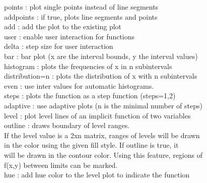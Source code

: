 \documentclass[a4paper,10pt]{article}
\begin{document}
\begin{eulernotebook}
\begin{eulercomment}
\begin{eulercomment}
\begin{eulercomment}
\begin{eulercomment}
\begin{eulercomment}
\begin{eulercomment}
\begin{eulercomment}
\begin{eulercomment}
\begin{eulercomment}
\begin{eulercomment}
\begin{eulercomment}
\begin{eulercomment}
\begin{eulercomment}
\begin{eulercomment}
\begin{eulercomment}
\begin{eulercomment}
\begin{eulercomment}
\begin{eulercomment}
\begin{eulercomment}
\begin{eulercomment}
\begin{eulercomment}
\begin{eulercomment}
\begin{eulercomment}
\begin{eulercomment}
\begin{eulercomment}
\begin{eulercomment}
\begin{eulercomment}
\begin{eulercomment}
\begin{eulercomment}
\begin{eulercomment}
\begin{eulercomment}
\begin{eulercomment}
\begin{eulercomment}
\begin{eulercomment}
\begin{eulercomment}
\begin{eulercomment}
\begin{eulercomment}
points    : plot single points instead of line segments\\
addpoints : if true, plots line segments and points\\
add       : add the plot to the existing plot\\
user      : enable user interaction for functions\\
delta     : step size for user interaction\\
bar       : bar plot (x are the interval bounds, y the interval values)\\
histogram : plots the frequencies of x in n subintervals\\
distribution=n : plots the distribution of x with n subintervals\\
even      : use inter values for automatic histograms.\\
steps     : plots the function as a step function (steps=1,2)\\
adaptive  : use adaptive plots (n is the minimal number of steps)\\
level     : plot level lines of an implicit function of two variables\\
outline   : draws boundary of level ranges.
\\
If the level value is a 2xn matrix, ranges of levels will be drawn\\
in the color using the given fill style. If outline is true, it\\
will be drawn in the contour color. Using this feature, regions of\\
f(x,y) between limits can be marked.
\\
hue       : add hue color to the level plot to indicate the function\\

\end{eulercomment}
\end{eulercomment}
\end{eulercomment}
\end{eulercomment}
\end{eulercomment}
\end{eulercomment}
\end{eulercomment}
\end{eulercomment}
\end{eulercomment}
\end{eulercomment}
\end{eulercomment}
\end{eulercomment}
\end{eulercomment}
\end{eulercomment}
\end{eulercomment}
\end{eulercomment}
\end{eulercomment}
\end{eulercomment}
\end{eulercomment}
\end{eulercomment}
\end{eulercomment}
\end{eulercomment}
\end{eulercomment}
\end{eulercomment}
\end{eulercomment}
\end{eulercomment}
\end{eulercomment}
\end{eulercomment}
\end{eulercomment}
\end{eulercomment}
\end{eulercomment}
\end{eulercomment}
\end{eulercomment}
\end{eulercomment}
\end{eulercomment}
\end{eulercomment}
\end{eulercomment}
\end{eulernotebook}
\end{document}
